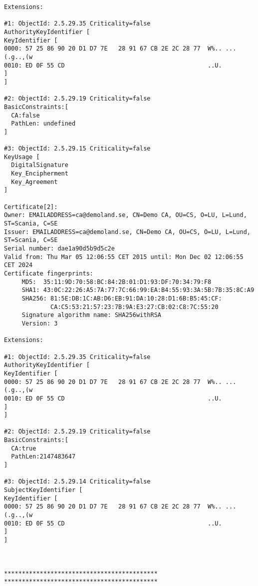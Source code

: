 \documentclass[11pt,a4paper]{article}
\begin{document}
\begin{verbatim}
Extensions: 

#1: ObjectId: 2.5.29.35 Criticality=false
AuthorityKeyIdentifier [
KeyIdentifier [
0000: 57 25 86 90 20 D1 D7 7E   28 91 67 CB 2E 2C 28 77  W%.. ...(.g..,(w
0010: ED 0F 55 CD                                        ..U.
]
]

#2: ObjectId: 2.5.29.19 Criticality=false
BasicConstraints:[
  CA:false
  PathLen: undefined
]

#3: ObjectId: 2.5.29.15 Criticality=false
KeyUsage [
  DigitalSignature
  Key_Encipherment
  Key_Agreement
]

Certificate[2]:
Owner: EMAILADDRESS=ca@demoland.se, CN=Demo CA, OU=CS, O=LU, L=Lund, ST=Scania, C=SE
Issuer: EMAILADDRESS=ca@demoland.se, CN=Demo CA, OU=CS, O=LU, L=Lund, ST=Scania, C=SE
Serial number: dae1a90d5b9d5c2e
Valid from: Thu Mar 05 12:06:55 CET 2015 until: Mon Dec 02 12:06:55 CET 2024
Certificate fingerprints:
	 MD5:  35:11:9D:70:58:BC:84:2B:01:D1:93:DF:70:34:79:F8
	 SHA1: 43:0C:22:26:A5:7A:77:7C:66:99:EA:B4:55:93:3A:5B:7B:35:8C:A9
	 SHA256: 81:5E:DB:1C:AB:D6:EB:91:DA:10:28:D1:6B:B5:45:CF:
	         CA:C5:53:21:57:23:7B:9A:E3:27:CB:02:C8:7C:55:20
	 Signature algorithm name: SHA256withRSA
	 Version: 3

Extensions: 

#1: ObjectId: 2.5.29.35 Criticality=false
AuthorityKeyIdentifier [
KeyIdentifier [
0000: 57 25 86 90 20 D1 D7 7E   28 91 67 CB 2E 2C 28 77  W%.. ...(.g..,(w
0010: ED 0F 55 CD                                        ..U.
]
]

#2: ObjectId: 2.5.29.19 Criticality=false
BasicConstraints:[
  CA:true
  PathLen:2147483647
]

#3: ObjectId: 2.5.29.14 Criticality=false
SubjectKeyIdentifier [
KeyIdentifier [
0000: 57 25 86 90 20 D1 D7 7E   28 91 67 CB 2E 2C 28 77  W%.. ...(.g..,(w
0010: ED 0F 55 CD                                        ..U.
]
]



*******************************************
*******************************************
\end{verbatim}

\newpage
\end{document}
